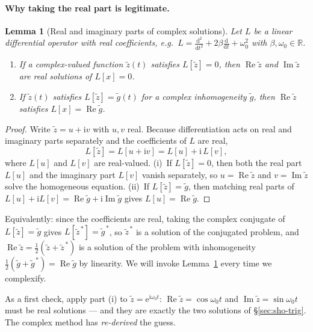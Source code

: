 \documentclass[11pt]{article}
\theoremstyle{plain}
\newtheorem{lemma}{Lemma}[section]
\theoremstyle{definition}
\theoremstyle{remark}
\newcommand{\dd}{\mathrm{d}}
\newcommand{\ee}{\mathrm{e}}
\newcommand{\ii}{\mathrm{i}}
\newcommand{\Rre}{\operatorname{Re}}
\newcommand{\Iim}{\operatorname{Im}}
\begin{document}
\paragraph{Why taking the real part is legitimate.}

\begin{lemma}[Real and imaginary parts of complex solutions]\label{lem:real}
Let $L$ be a linear differential operator with \emph{real} coefficients, e.g.\
$L = \frac{\dd^2}{\dd t^2} + 2\beta\frac{\dd}{\dd t} + \omega_0^2$ with
$\beta,\omega_0\in\mathbb{R}$.
\begin{enumerate}
  \item[(i)] If a complex-valued function $\tilde z(t)$ satisfies
  $L[\tilde z]=0$, then $\Rre \tilde z$ and $\Iim \tilde z$ are real
  solutions of $L[x]=0$.
  \item[(ii)] If $\tilde z(t)$ satisfies $L[\tilde z] = \tilde g(t)$ for a
  complex inhomogeneity $\tilde g$, then $\Rre \tilde z$ satisfies
  $L[x] = \Rre \tilde g$.
\end{enumerate}
\end{lemma}

\begin{proof}
Write $\tilde z = u + \ii v$ with $u,v$ real. Because differentiation acts
on real and imaginary parts separately and the coefficients of $L$ are real,
\begin{equation}
  L[\tilde z] = L[u+\ii v] = L[u] + \ii\, L[v],
\end{equation}
where $L[u]$ and $L[v]$ are real-valued. (i)~If $L[\tilde z]=0$, then both
the real part $L[u]$ and the imaginary part $L[v]$ vanish separately, so
$u = \Rre \tilde z$ and $v=\Iim \tilde z$ solve the homogeneous equation.
(ii)~If $L[\tilde z]=\tilde g$, then matching real parts of
$L[u]+\ii L[v] = \Rre \tilde g + \ii \Iim \tilde g$ gives
$L[u]=\Rre \tilde g$.
\end{proof}

Equivalently: since the coefficients are real, taking the complex conjugate
of $L[\tilde z]=\tilde g$ gives $L[\tilde z^{\,*}]=\tilde g^{\,*}$, so
$\tilde z^{\,*}$ is a solution of the conjugated problem, and
$\Rre \tilde z = \tfrac12(\tilde z+\tilde z^{\,*})$ is a solution of the
problem with inhomogeneity
$\tfrac12(\tilde g + \tilde g^{\,*})=\Rre \tilde g$ by linearity. We will
invoke Lemma~\ref{lem:real} every time we complexify.

As a first check, apply part (i) to $\tilde z = \ee^{\ii\omega_0 t}$:
$\Rre \tilde z = \cos\omega_0 t$ and $\Iim \tilde z = \sin\omega_0 t$ must be real
solutions --- and they are exactly the two solutions of
\S\ref{sec:sho-trig}. The complex method has \emph{re-derived} the guess.
\end{document}
